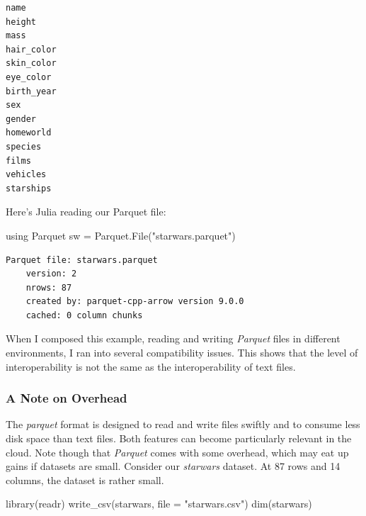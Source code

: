 \documentclass[
  12pt,
  letterpaper,
]{krantz}
\newenvironment{Shaded}{\begin{snugshade}}{\end{snugshade}}
\newcommand{\AttributeTok}[1]{\textcolor[rgb]{0.40,0.45,0.13}{#1}}
\newcommand{\BuiltInTok}[1]{\textcolor[rgb]{0.00,0.23,0.31}{#1}}
\newcommand{\FunctionTok}[1]{\textcolor[rgb]{0.28,0.35,0.67}{#1}}
\newcommand{\ImportTok}[1]{\textcolor[rgb]{0.00,0.46,0.62}{#1}}
\newcommand{\NormalTok}[1]{\textcolor[rgb]{0.00,0.23,0.31}{#1}}
\newcommand{\OperatorTok}[1]{\textcolor[rgb]{0.37,0.37,0.37}{#1}}
\newcommand{\StringTok}[1]{\textcolor[rgb]{0.13,0.47,0.30}{#1}}
\begin{document}
\begin{verbatim}
name
height
mass
hair_color
skin_color
eye_color
birth_year
sex
gender
homeworld
species
films
vehicles
starships
\end{verbatim}

\normalsize

Here's Julia reading our Parquet file:

\normalsize

\begin{Shaded}
\begin{Highlighting}[]
\ImportTok{using} \BuiltInTok{Parquet}
\NormalTok{sw }\OperatorTok{=}\NormalTok{ Parquet.}\FunctionTok{File}\NormalTok{(}\StringTok{"starwars.parquet"}\NormalTok{)}
\end{Highlighting}
\end{Shaded}

\begin{verbatim}
Parquet file: starwars.parquet
    version: 2
    nrows: 87
    created by: parquet-cpp-arrow version 9.0.0
    cached: 0 column chunks
\end{verbatim}

\normalsize

When I composed this example, reading and writing \emph{Parquet} files
in different environments, I ran into several compatibility issues. This
shows that the level of interoperability is not
the same as the interoperability of text files.

\hypertarget{columnar}{%
\subsubsection{A Note on Overhead}\label{columnar}}

The \emph{parquet} format is designed to read and write files swiftly
and to consume less disk space than text files. Both features can become
particularly relevant in the cloud. Note though that \emph{Parquet}
comes with some overhead, which may eat up gains if datasets are small.
Consider our \emph{starwars} dataset. At 87 rows and 14 columns, the
dataset is rather small.

\normalsize

\begin{Shaded}
\begin{Highlighting}[]
\FunctionTok{library}\NormalTok{(readr)}
\FunctionTok{write\_csv}\NormalTok{(starwars, }\AttributeTok{file =} \StringTok{"starwars.csv"}\NormalTok{)}
\FunctionTok{dim}\NormalTok{(starwars)}
\end{Highlighting}
\end{Shaded}
\end{document}

